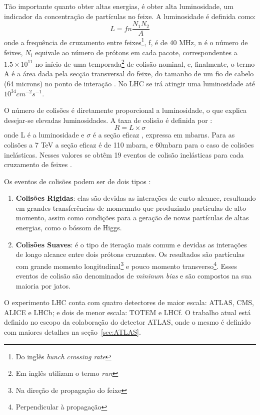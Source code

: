 Tão importante quanto obter altas energias, é obter alta
luminosidade, um indicador da concentração 
de partículas no feixe. A luminosidade é definida como:
\begin{equation}
L=fn\frac{N_1 N_2}{A}
\label{eq:luminosidade}
\end{equation}
onde a frequência de cruzamento entre feixes\footnote{Do
inglês \emph{bunch crossing rate}}, f, é de 
40 MHz, n é o número de feixes, $N_i$ equivale ao número de prótons em
cada pacote, correspondentes a $1.5\times10^{11}$ no início de uma
temporada\footnote{Em inglês utilizam o termo \emph{run}} de colisão nominal, e,
finalmente, o termo A é a área dada pela secção transversal do feixe, do tamanho
de um fio de cabelo (64 microns) no ponto de interação \cite{webLHC}. No LHC se
irá atingir uma luminosidade até $10^{34}cm^{-2}s^{-1}$.

O número de colisões é diretamente proporcional a luminosidade, o que explica
desejar-se elevadas luminosidades. A taxa de colisão é definida por
\cite{ATLAS_TDR}:
\begin{equation}
R = L \times \sigma
\label{eq:taxa_colisao}
\end{equation}
onde L é a luminosidade e $\sigma$ é a seção eficaz \cite{wiki_cross_section},
expressa em mbarns. Para as colisões a 7 TeV a seção eficaz é de 110 mbarn, e
60mbarn para o caso de colisões inelásticas.
Nesses valores se obtêm 19 eventos de colisão inelásticas para cada
cruzamento de feixes \cite{webLHC}.

Os eventos de colisões podem ser de dois tipos \cite{THESIS_LAR}:

\begin{enumerate}
\item \textbf{Colisões Rigidas}:
elas são devidas as interações de curto alcance,
resultando em grandes transferências de momemnto que produzindo partículas de
alto momento, assim como condições para a geração de novas partículas de altas
energias, como o bóssom de Higgs.
\item \textbf{Colisões Suaves}: 
é o tipo de iteração mais comum e devidas as interações de longo alcance entre dois prótons cruzantes. Os
resultados são partículas com grande momento longitudinal\footnote{Na direção de
propagação do feixe} e pouco momento transverso\footnote{Perpendicular à
propagação}. Esses eventos de colisão são
denominados de \emph{mininum bias} e são compostos na sua maioria por jatos.
\end{enumerate}

O experimento LHC conta com quatro detectores de maior escala: ATLAS, CMS, ALICE e
LHCb; e dois de menor escala: TOTEM e LHCf. O trabalho atual está definido no
escopo da colaboração do detector ATLAS, onde o mesmo é definido com maiores
detalhes na seção~\ref{sec:ATLAS}.

